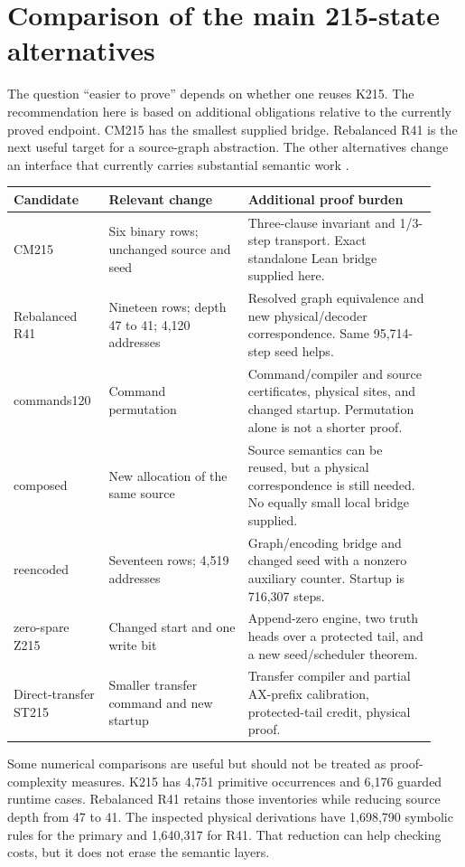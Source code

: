\documentclass[11pt]{article}
\begin{document}
\section{Comparison of the main 215-state alternatives}

The question ``easier to prove'' depends on whether one reuses K215. The recommendation here is based on additional obligations relative to the currently proved endpoint. CM215 has the smallest supplied bridge. Rebalanced R41 is the next useful target for a source-graph abstraction. The other alternatives change an interface that currently carries substantial semantic work \cite{alternatives,rebalanced,reencoded,zero,direct}.

\begin{center}
\small
\begin{tabular}{@{}p{0.20\linewidth}p{0.31\linewidth}p{0.42\linewidth}@{}}
\toprule
Candidate & Relevant change & Additional proof burden \\
\midrule
CM215 & Six binary rows; unchanged source and seed & Three-clause invariant and 1/3-step transport. Exact standalone Lean bridge supplied here. \\
Rebalanced R41 & Nineteen rows; depth 47 to 41; 4,120 addresses & Resolved graph equivalence and new physical/decoder correspondence. Same 95,714-step seed helps. \\
commands120 & Command permutation & Command/compiler and source certificates, physical sites, and changed startup. Permutation alone is not a shorter proof. \\
composed & New allocation of the same source & Source semantics can be reused, but a physical correspondence is still needed. No equally small local bridge supplied. \\
reencoded & Seventeen rows; 4,519 addresses & Graph/encoding bridge and changed seed with a nonzero auxiliary counter. Startup is 716,307 steps. \\
zero-spare Z215 & Changed start and one write bit & Append-zero engine, two truth heads over a protected tail, and a new seed/scheduler theorem. \\
Direct-transfer ST215 & Smaller transfer command and new startup & Transfer compiler and partial AX-prefix calibration, protected-tail credit, physical proof. \\
\bottomrule
\end{tabular}
\end{center}

Some numerical comparisons are useful but should not be treated as proof-complexity measures. K215 has 4,751 primitive occurrences and 6,176 guarded runtime cases. Rebalanced R41 retains those inventories while reducing source depth from 47 to 41. The inspected physical derivations have 1,698,790 symbolic rules for the primary and 1,640,317 for R41. That reduction can help checking costs, but it does not erase the semantic layers.
\end{document}
